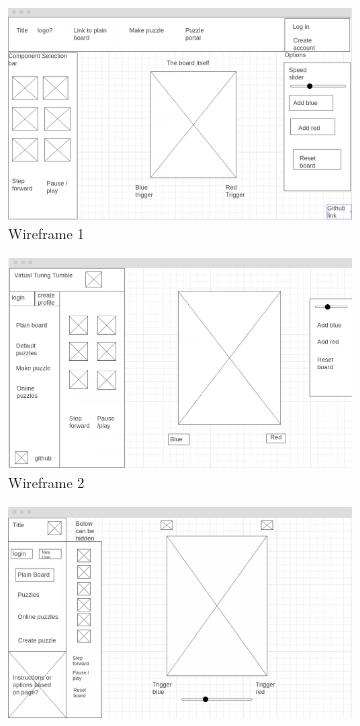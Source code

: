 \documentclass{l4proj}
\begin{document}
\begin{figure}
    \centering
    \begin{subfigure}[b]{0.5\textwidth}
        \includegraphics[width=\textwidth]{images/wireframe1.png}
        \caption{Wireframe 1}
        \label{fig:wireframe1}
    \end{subfigure}
    \begin{subfigure}[b]{0.5\textwidth}
        \includegraphics[width=\textwidth]{images/wireframe2.png}
        \caption{Wireframe 2}
        \label{fig:wireframe2}
    \end{subfigure}\begin{subfigure}[b]{0.5\textwidth}
        \includegraphics[width=\textwidth]{images/wireframe3.png}

\end{subfigure}
\end{figure}
\end{document}
